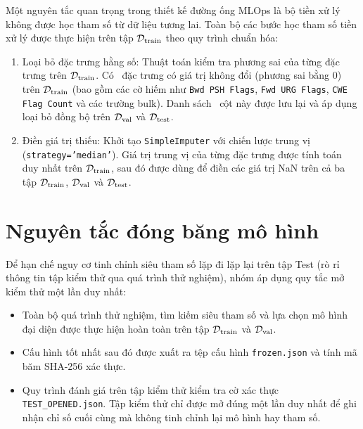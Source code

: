 Một nguyên tắc quan trọng trong thiết kế đường ống MLOps là bộ tiền xử lý không được học tham số từ dữ liệu tương lai. Toàn bộ các bước học tham số tiền xử lý được thực hiện trên tập $\mathcal{D}_{\text{train}}$ theo quy trình chuẩn hóa:
\begin{enumerate}
    \item Loại bỏ đặc trưng hằng số: Thuật toán kiểm tra phương sai của từng đặc trưng trên $\mathcal{D}_{\text{train}}$. Có \FeatConstantDropped\ đặc trưng có giá trị không đổi (phương sai bằng 0) trên $\mathcal{D}_{\text{train}}$ (bao gồm các cờ hiếm như \texttt{Bwd PSH Flags}, \texttt{Fwd URG Flags}, \texttt{CWE Flag Count} và các trường bulk). Danh sách \FeatConstantDropped\ cột này được lưu lại và áp dụng loại bỏ đồng bộ trên $\mathcal{D}_{\text{val}}$ và $\mathcal{D}_{\text{test}}$.
    \item Điền giá trị thiếu: Khởi tạo \texttt{SimpleImputer} với chiến lược trung vị (\texttt{strategy='median'}). Giá trị trung vị của từng đặc trưng được tính toán duy nhất trên $\mathcal{D}_{\text{train}}$, sau đó được dùng để điền các giá trị NaN trên cả ba tập $\mathcal{D}_{\text{train}}$, $\mathcal{D}_{\text{val}}$ và $\mathcal{D}_{\text{test}}$.
\end{enumerate}

\section{Nguyên tắc đóng băng mô hình}

Để hạn chế nguy cơ tinh chỉnh siêu tham số lặp đi lặp lại trên tập Test (rò rỉ thông tin tập kiểm thử qua quá trình thử nghiệm), nhóm áp dụng quy tắc mở kiểm thử một lần duy nhất:
\begin{itemize}
    \item Toàn bộ quá trình thử nghiệm, tìm kiếm siêu tham số và lựa chọn mô hình đại diện được thực hiện hoàn toàn trên tập $\mathcal{D}_{\text{train}}$ và $\mathcal{D}_{\text{val}}$.
    \item Cấu hình tốt nhất sau đó được xuất ra tệp cấu hình \texttt{frozen.json} và tính mã băm SHA-256 xác thực.
    \item Quy trình đánh giá trên tập kiểm thử kiểm tra cờ xác thực \texttt{TEST\_OPENED.json}. Tập kiểm thử chỉ được mở đúng một lần duy nhất để ghi nhận chỉ số cuối cùng mà không tinh chỉnh lại mô hình hay tham số.
\end{itemize}
